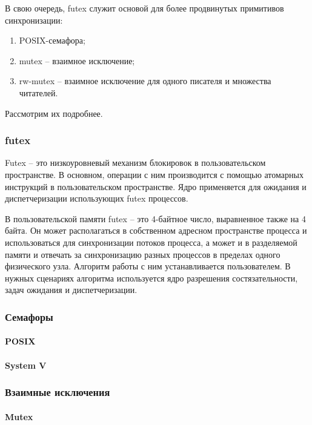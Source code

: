 В свою очередь, futex служит основой для более продвинутых примитивов синхронизации:
\begin{enumerate}
\item POSIX-семафора;
\item mutex -- взаимное исключение;
\item rw-mutex -- взаимное исключение для одного писателя и множества читателей.
\end{enumerate}

Рассмотрим их подробнее.

\subsubsection{futex}

Futex \cite{FutexOrigins} -- это низкоуровневый механизм блокировок в пользовательском пространстве. В основном, операции с ним производится с помощью атомарных инструкций в пользовательском пространстве. Ядро применяется для ожидания и диспетчеризации использующих futex процессов.

В пользовательской памяти futex -- это 4-байтное число, выравненное также на 4 байта. Он может располагаться в собственном адресном пространстве процесса и использоваться для синхронизации потоков процесса, а может и в разделяемой памяти и отвечать за синхронизацию разных процессов в пределах одного физического узла. Алгоритм работы с ним устанавливается пользователем. В нужных сценариях алгоритма используется ядро разрешения состязательности, задач ожидания и диспетчеризации.

\subsubsection{Семафоры}

\paragraph{POSIX}

\paragraph{System V}

\subsubsection{Взаимные исключения}
\paragraph{Mutex}

